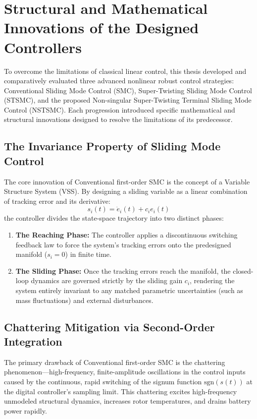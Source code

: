 \section{Structural and Mathematical Innovations of the Designed Controllers}
To overcome the limitations of classical linear control, this thesis developed and comparatively evaluated three advanced nonlinear robust control strategies: Conventional Sliding Mode Control (SMC), Super-Twisting Sliding Mode Control (STSMC), and the proposed Non-singular Super-Twisting Terminal Sliding Mode Control (NSTSMC). Each progression introduced specific mathematical and structural innovations designed to resolve the limitations of its predecessor.

\subsection{The Invariance Property of Sliding Mode Control}
The core innovation of Conventional first-order SMC is the concept of a Variable Structure System (VSS). By designing a sliding variable as a linear combination of tracking error and its derivative:
\begin{equation}
s_i(t) = \dot{e}_i(t) + c_i e_i(t)
\end{equation}
the controller divides the state-space trajectory into two distinct phases:
\begin{enumerate}
    \item \textbf{The Reaching Phase:} The controller applies a discontinuous switching feedback law to force the system's tracking errors onto the predesigned manifold ($s_i = 0$) in finite time.
    \item \textbf{The Sliding Phase:} Once the tracking errors reach the manifold, the closed-loop dynamics are governed strictly by the sliding gain $c_i$, rendering the system entirely invariant to any matched parametric uncertainties (such as mass fluctuations) and external disturbances.
\end{enumerate}

\subsection{Chattering Mitigation via Second-Order Integration}
The primary drawback of Conventional first-order SMC is the chattering phenomenon—high-frequency, finite-amplitude oscillations in the control inputs caused by the continuous, rapid switching of the signum function $\text{sgn}(s(t))$ at the digital controller's sampling limit. This chattering excites high-frequency unmodeled structural dynamics, increases rotor temperatures, and drains battery power rapidly.

